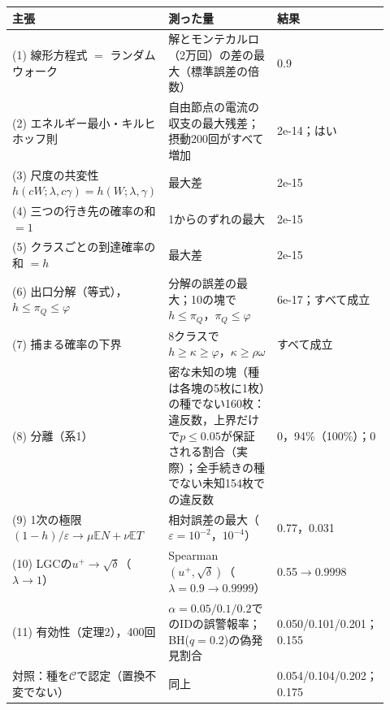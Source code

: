 \begin{tabular}{p{0.30\linewidth}p{0.42\linewidth}p{0.20\linewidth}}
\toprule
主張 & 測った量 & 結果\\
\midrule
(1) 線形方程式 $=$ ランダムウォーク & 解とモンテカルロ（2万回）の差の最大（標準誤差の倍数） & 0.9\\
(2) エネルギー最小・キルヒホッフ則 & 自由節点の電流の収支の最大残差；摂動200回がすべて増加 & 2e-14；はい\\
(3) 尺度の共変性 $h(cW;\lambda,c\gamma)=h(W;\lambda,\gamma)$ & 最大差 & 2e-15\\
(4) 三つの行き先の確率の和 $=1$ & 1からのずれの最大 & 2e-15\\
(5) クラスごとの到達確率の和 $=h$ & 最大差 & 2e-15\\
(6) 出口分解（等式），$h\le\pi_Q\le\varphi$ & 分解の誤差の最大；10の塊で$h\le\pi_Q$，$\pi_Q\le\varphi$ & 6e-17；すべて成立\\
(7) 捕まる確率の下界 & 8クラスで$h\ge\kappa\ge\varphi$，$\kappa\ge\rho\omega$ & すべて成立\\
(8) 分離（系1）& 密な未知の塊（種は各塊の5枚に1枚）の種でない160枚：違反数，上界だけで$p\le0.05$が保証される割合（実際）；全手続きの種でない未知154枚での違反数 & 0，94\%（100\%）；0\\
(9) 1次の極限 $(1-h)/\varepsilon\to\mu\mathbb{E}N+\nu\mathbb{E}T$ & 相対誤差の最大（$\varepsilon{=}10^{-2}$，$10^{-4}$）& 0.77，0.031\\
(10) LGCの$u^{+}\to\sqrt{\delta}$（$\lambda\to1$）& Spearman$(u^{+},\sqrt\delta)$（$\lambda{=}0.9\to0.9999$）& 0.55$\to$0.9998\\
(11) 有効性（定理2），400回 & $\alpha{=}0.05/0.1/0.2$でのIDの誤警報率；BH($q{=}0.2$)の偽発見割合 & 0.050/0.101/0.201；0.155\\
\quad 対照：種を$\mathcal{C}$で認定（置換不変でない）& 同上 & 0.054/0.104/0.202；0.175\\
\bottomrule
\end{tabular}
